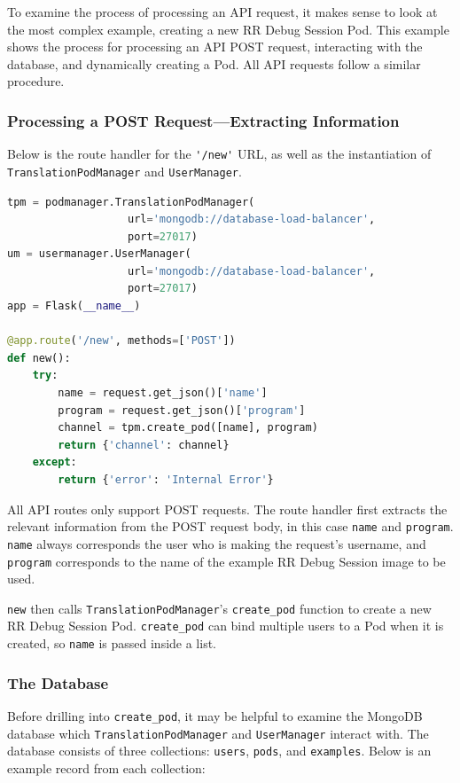 \documentclass[12pt]{article}
\begin{document}
To examine the process of processing an API request, it makes sense to
look at the most complex example, creating a new RR Debug Session Pod.
This example shows the process for processing an API POST request,
interacting with the database, and dynamically creating a Pod.  All
API requests follow a similar procedure.

\subsubsection{Processing a POST Request---Extracting Information}

Below is the route handler for the \lstinline{'/new'} URL, as well as
the instantiation of \lstinline{TranslationPodManager} and
\lstinline{UserManager}.

\begin{lstlisting}[language=Python,basicstyle=\linespread{0.5}\ttfamily,caption={API Server New RR Debug Session Event Handler},captionpos=b]
tpm = podmanager.TranslationPodManager(
                   url='mongodb://database-load-balancer',
                   port=27017)
um = usermanager.UserManager(
                   url='mongodb://database-load-balancer',
                   port=27017)
app = Flask(__name__)

@app.route('/new', methods=['POST'])
def new():
    try:
        name = request.get_json()['name']
        program = request.get_json()['program']
        channel = tpm.create_pod([name], program)
        return {'channel': channel}
    except:
        return {'error': 'Internal Error'}
\end{lstlisting}

All API routes only support POST requests.  The route handler first
extracts the relevant information from the POST request body, in this
case \lstinline{name} and \lstinline{program}.  \lstinline{name}
always corresponds the user who is making the request's username, and
\lstinline{program} corresponds to the name of the example RR Debug
Session image to be used.
\par

\lstinline{new} then calls \lstinline{TranslationPodManager}'s
\lstinline{create_pod} function to create a new RR Debug Session Pod.
\lstinline{create_pod} can bind multiple users to a Pod when it is
created, so \lstinline{name} is passed inside a list.

\subsubsection{The Database} Before drilling into \lstinline{create_pod},
it may be helpful to examine the MongoDB database which
\lstinline{TranslationPodManager} and \lstinline{UserManager} interact
with.  The database consists of three collections: \lstinline{users},
\lstinline{pods}, and \lstinline{examples}.  Below is an example
record from each collection:
\end{document}
